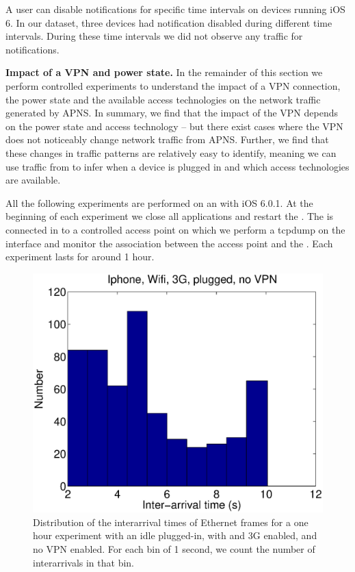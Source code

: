 A user can disable notifications for specific time intervals on
devices running iOS 6. In our dataset, three devices had notification
disabled during different time intervals. During these time intervals
we did not observe any traffic for notifications.

\noindent\textbf{Impact of a VPN and power state.}
In the remainder of this section we perform controlled experiments 
to understand the impact of a VPN connection, the power state and 
the available access technologies on the network traffic generated 
by APNS. In summary, we find that the impact of the VPN depends 
on the power state and access technology -- but there exist cases 
where the VPN does not noticeably change network traffic from APNS.
Further, we find that these changes in traffic patterns are relatively 
easy to identify, meaning we can use traffic from \meddle to infer 
when a device is plugged in and which access technologies are 
available.

All the following experiments are performed on an  with iOS
6.0.1.  At the beginning of each experiment we close all applications
and restart the \iphone{}. The \iphone{} is connected in \wifi{} to a
controlled access point on which we perform a tcpdump on the \wifi{}
interface and monitor the \wifi{} association between the access point
and the \iphone{}. Each experiment lasts for around 1 hour. 

\begin{figure}
\centering
        \includegraphics[width=0.8\linewidth]{../../code/pushNotification/Fig/bw_iphone_wifi_3g_plug_novpn_interTs.eps}
  \caption{Distribution of the interarrival times of Ethernet frames
    for a one hour experiment with an idle \iphone{} plugged-in, with \wifi{} and 3G
    enabled, and no VPN enabled. For each bin of 1 second, we count
    the number of interarrivals in that bin.}
  \label{fig:push_w3p_interTs}
\end{figure}

